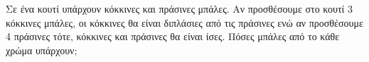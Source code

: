 Σε ένα κουτί υπάρχουν κόκκινες και πράσινες μπάλες. Αν προσθέσουμε στο κουτί 3 κόκκινες μπάλες, οι κόκκινες θα είναι διπλάσιες από τις πράσινες ενώ αν προσθέσουμε 4 πράσινες τότε, κόκκινες και πράσινες θα είναι ίσες. Πόσες μπάλες από το κάθε χρώμα υπάρχουν;
